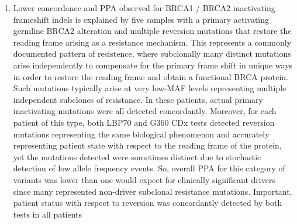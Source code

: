 \documentclass[12pt]{protocol}
\begin{document}
\begin{enumerate}
\begin{enumerate}
        \captionsetup{justification=justified,singlelinecheck=off,skip=0pt}
        \begin{table}[H]
        \centering
        \begin{threeparttable}
        \caption[PPA and NPA for each variant class over all sample collections]
        {\textbf{PPA and NPA for each variant class over all sample collections.}}
        \label{t:coll4_variant_classspecial_raw_binomial_2test}
        \scriptsize
        
        \caption*{ The 95\% Clopper-Pearson confidence intervals are shown in parantheses.
            ``Homopolymer'' refers to indels adjacent to a homopolymeric five or more identical
            nucleotides, a homopolymeric sequence (\textbf{D-000631, section 6.1.5.2.2}).  ``Long
            indel'' refers to indels greater than 30 base pairs (\textbf{D-000631, Section
            6.1.5.2.1}). Samples were selected such that each variant class had ten G360 LDT
            positives (\textbf{D-000631, section 6.1.5.1}).  Some rows may have fewer than ten
            positive samples when both G360 CDx and the LBP70 test did not detect G360 LDT-positive
            samples.}
        \end{threeparttable}
        \end{table}
        \item Lower concordance and PPA observed for BRCA1 / BRCA2 inactivating frameshift indels
            is explained by five samples with a primary activating germline BRCA2 alteration and
            multiple reversion mutations that restore the reading frame arising as a resistance
            mechanism. This represents a commonly documented pattern of resistence, where
            subclonally many distinct mutations arise independently to compensate for the primary
            frame shift in unique ways in order to restore the reading frame and obtain a
            functional BRCA protein. Such mutations typically arise at very low-MAF levels
            representing multiple independent subclones of resistance. In these patients, actual
            primary inactivating mutations were all detected concordantly. Moreover, for each
            patient of this type, both LBP70 and G360 CDx tests detected reversion mutations
            representing the same biological phenomenon and accurately representing patient state
            with respect to the reading frame of the protein, yet the mutations detected were
            sometimes distinct due to stochastic detection of low allele frequency events. So,
            overall PPA for this category of variants was lower than one would expect for
            clinically significant drivers since many represented non-driver subclonal resistance
            mutations. Important, patient status with respect to reversion was concordantly
            detected by both tests in all patients
    

\end{enumerate}
\end{enumerate}
\end{document}
